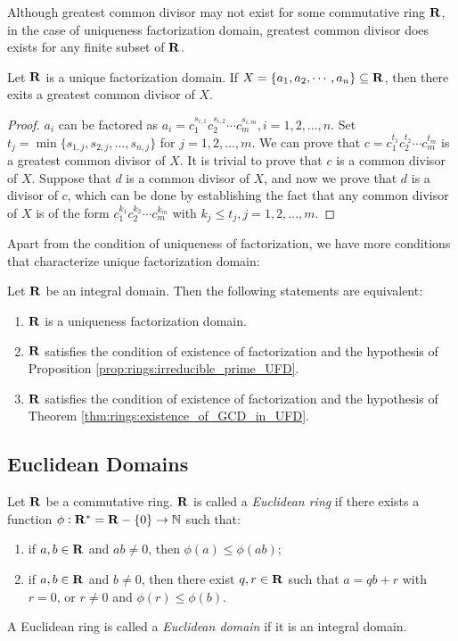 Although greatest common divisor may not exist for some commutative ring 
$\mathbf{R}$, in the case of uniqueness factorization domain, greatest common 
divisor does exists for any finite subset of $\mathbf{R}$. 
\begin{thm}
\label{thm:rings:existence_of_GCD_in_UFD}
Let $\mathbf{R}$ is a unique factorization domain. 
If $X = \{a_1, a_2, \cdots, a_n\} \subseteq \mathbf{R}$, then there exits a greatest 
common divisor of $X$.
\end{thm}
\begin{proof}
$a_i$ can be factored as $a_i = c_1^{s_{i, 1}} c_2^{s_{i, 2}} \cdots 
c_m^{s_{i, m}}, i=1, 2, \ldots, n$. 
Set $t_j = \min \{s_{1, j}, s_{2, j}, \ldots, s_{n, j}\}$ for $j = 1, 2, 
\ldots, m$.
We can prove that $c = c_1^{t_1} c_2^{t_2} \cdots c_m^{t_m}$ is a greatest 
common divisor of $X$. 
It is trivial to prove that $c$ is a common divisor of $X$. 
Suppose that $d$ is a common divisor of $X$, and now we prove that $d$ is a 
divisor of $c$, which can be done by establishing the fact that any common 
divisor of $X$ is of the form $c_1^{k_1} c_2^{k_2} \cdots c_m^{k_m}$ with 
$k_j \le t_j, j=1, 2, \ldots, m$.
\end{proof}

Apart from the condition of uniqueness of factorization, we have more 
conditions that characterize unique factorization domain: 

\begin{thm}
Let $\mathbf{R}$ be an integral domain. Then the following statements are 
equivalent: 
\begin{enumerate}
    \item $\mathbf{R}$ is a uniqueness factorization domain. 
    \item $\mathbf{R}$ satisfies the condition of existence of factorization 
    and the hypothesis of Proposition \ref{prop:rings:irreducible_prime_UFD}. 
    \item $\mathbf{R}$ satisfies the condition of existence of factorization 
    and the hypothesis of Theorem \ref{thm:rings:existence_of_GCD_in_UFD}.
\end{enumerate}
\end{thm}

\subsection{Euclidean Domains}
\begin{defn}
Let $\mathbf{R}$ be a commutative ring. $\mathbf{R}$ is called a \emph{Euclidean ring} 
if there exists a function $\phi: \mathbf{R}^\ast = \mathbf{R} - \{0\} \to \mathbb{N}$ such that:
\begin{enumerate}
    \item if $a, b \in \mathbf{R}$ and $ab \neq 0$, then $\phi(a) \le \phi(ab)$;
    \item if $a, b \in \mathbf{R}$ and $b \neq 0$, then there exist $q, r \in \mathbf{R}$ 
    such that $a = qb + r$ with $r = 0$, or $r \neq 0$ and $\phi(r) \le 
    \phi(b)$. 
\end{enumerate}
A Euclidean ring is called a \emph{Euclidean domain} if it is an integral domain. 
\end{defn}


